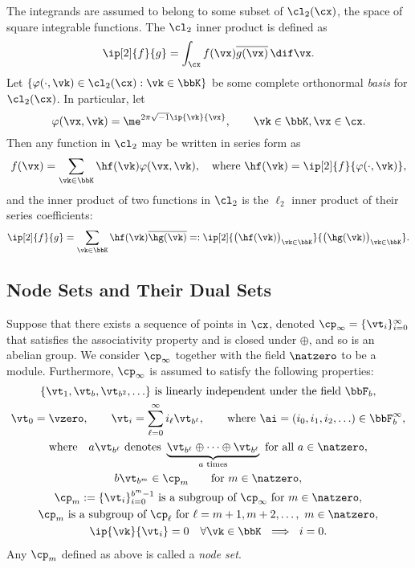 \documentclass[]{elsarticle}
\theoremstyle{definition}
\begin{document}
The integrands are assumed to belong to some subset of $\cl_2(\cx)$, the space of square integrable functions.  The $\cl_2$ inner product is defined as 
\[
\ip[2]{f}{g} = \int_{\cx} f(\vx) \overline{g(\vx)} \, \dif \vx.
\]
Let $\{\varphi(\cdot,\vk) \in \cl_2(\cx) : \vk \in \bbK\}$ be some complete orthonormal \emph{basis} for $\cl_2(\cx)$. In particular, let 
\[
\varphi(\vx,\vk)  = \me^{2 \pi \sqrt{-1} \ip{\vk}{\vx}}, \qquad \vk \in \bbK, \vx \in \cx.
\]
Then any function in $\cl_2$ may be written in series form as
\begin{equation} \label{Fourierdef}
f(\vx) = \sum_{\vk \in \bbK} \hf(\vk) \varphi(\vx,\vk), \quad \text{where } \hf(\vk) = \ip[2]{f}{\varphi(\cdot,\vk)},
\end{equation}
and the inner product of two functions in $\cl_2$ is the $\ell_2$ inner product of their series coefficients:
\[
\ip[2]{f}{g} = \sum_{\vk \in \bbK} \hf(\vk)\overline{\hg(\vk)} =: \ip[2]{\bigl(\hf(\vk)\bigr)_{\vk \in \bbK}}{\bigl ( \hg(\vk)\bigr )_{\vk \in \bbK}}.
\]

\subsection{Node Sets and Their Dual Sets}
Suppose that there exists a sequence of points in $\cx$, denoted $\cp_\infty =\{\vt_i\}_{i=0}^{\infty}$ that satisfies the associativity property and is closed under $\oplus$, and so is an abelian group.  We consider $\cp_\infty$ together with the field $\natzero$ to be a module.  Furthermore, $\cp_\infty$ is assumed to satisfy the following properties:
\begin{subequations} \label{cpinfvector}
\begin{gather}
\{\vt_1, \vt_b, \vt_{b^2}, \ldots\} \text{ is linearly independent under the field } \bbF_b, \\
\vt_0=\vzero, \qquad 
\vt_i = \sum_{\ell=0}^{\infty} i_\ell \vt_{b^\ell}, \qquad \text{where }\ai=(i_0, i_1, i_2, \ldots ) \in \bbF_b^\infty,\\
\text{where} \quad a \vt_{b^\ell} \text{ denotes } \underbrace{\vt_{b^\ell} \oplus \cdots \oplus \vt_{b^\ell}}_{a \text{ times}} \text{ for all } a \in \natzero, \\
b \vt_{b^{m}} \in \cp_m \qquad \text{for } m\in \natzero, \\
\cp_m := \{\vt_i\}_{i=0}^{b^m-1} \text{ is a subgroup of } \cp_\infty \text{ for } m\in \natzero, \\
\cp_m \text{ is a subgroup of } \cp_\ell \text{ for } \ell=m+1, m+2, \ldots, \ m\in \natzero, \\
\ip{\vk}{\vt_i} = 0 \quad \forall \vk \in \bbK \ \implies \ i=0.
\end{gather}
\end{subequations}
Any $\cp_m$ defined as above is called a \emph{node set}.
\end{document}
